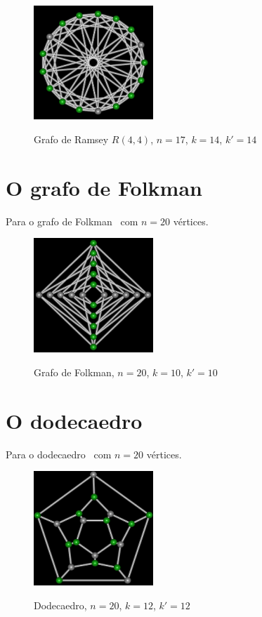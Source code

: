 \begin{figure}[htb]
\centering
\includegraphics[width=0.4\textwidth]{img/ramsey.png}
\label{fig:example-ramsey}
\caption{Grafo de Ramsey $R(4,4)$, $n=17$, $k=14$, $k'=14$}
\end{figure}


\section{O grafo de Folkman}
Para o grafo de Folkman~\cite{cite:example-folkman} com $n=20$
vértices.

\begin{figure}[htb]
\centering
\includegraphics[width=0.4\textwidth]{img/folkman.png}
\label{fig:example-folkman}
\caption{Grafo de Folkman, $n=20$, $k=10$, $k'=10$}
\end{figure}


\section{O dodecaedro}
Para o dodecaedro~\cite{cite:example-plato} com $n=20$ vértices.

\begin{figure}[htb]
\centering
\includegraphics[width=0.4\textwidth]{img/dodecaedro.png}
\label{fig:example-dodecaedro}
\caption{Dodecaedro, $n=20$, $k=12$, $k'=12$}
\end{figure}

